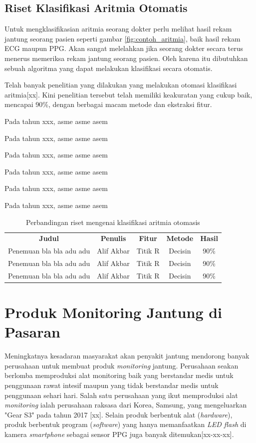 \subsection{Riset Klasifikasi Aritmia Otomatis}
Untuk mengklasifikasian aritmia seorang dokter perlu melihat hasil rekam jantung seorang pasien seperti gambar \ref{fig:contoh_aritmia}, baik hasil rekam ECG maupun PPG. Akan sangat melelahkan jika seorang dokter secara terus menerus memeriksa rekam jantung seorang pasien. Oleh karena itu dibutuhkan sebuah algoritma yang dapat melakukan klasifikasi secara otomatis. 

Telah banyak penelitian yang dilakukan yang melakukan otomasi klasifikasi aritmia[xx]. Kini penelitian tersebut telah memiliki keakuratan yang cukup baik, mencapai 90\%, dengan berbagai macam metode dan ekstraksi fitur.

Pada tahun xxx, asme asme asem

Pada tahun xxx, asme asme asem

Pada tahun xxx, asme asme asem

Pada tahun xxx, asme asme asem

Pada tahun xxx, asme asme asem

Pada tahun xxx, asme asme asem

\begin{table}[H]
\centering
	\begin{tabular}{|c|c|c|c|c|}
	\hline
	\rowcolor{gray}
	\textbf{Judul} & \textbf{Penulis} & \textbf{Fitur} & \textbf{Metode}  & \textbf{Hasil}\\
	\cline{1-5}
	Penemuan bla bla adu adu & Alif Akbar & Titik R & Decisin & 90\% \\
	\cline{1-5}
	Penemuan bla bla adu adu & Alif Akbar & Titik R & Decisin & 90\% \\
	\cline{1-5}
	Penemuan bla bla adu adu & Alif Akbar & Titik R & Decisin & 90\% \\
	\hline
	\end{tabular}
	\caption{Perbandingan riset mengenai klasifikasi aritmia otomasis}
	\label{table:tbl_comparison}
\end{table}

\section{Produk Monitoring Jantung di Pasaran}
Meningkatnya kesadaran masyarakat akan penyakit jantung mendorong banyak perusahaan untuk membuat produk \textit{monitoring} jantung. Perusahaan seakan berlomba memproduksi alat monitoring baik yang berstandar medis untuk penggunaan rawat intesif maupun yang tidak berstandar medis untuk penggunaan sehari hari. Salah satu perusahaan yang ikut memproduksi alat \textit{monitoring} ialah perusahaan raksasa dari Korea, Samsung, yang mengeluarkan "Gear S3" pada tahun 2017 [xx]. Selain produk berbentuk alat (\textit{hardware}), produk berbentuk program (\textit{software}) yang hanya memanfaatkan \textit{LED flash} di kamera \textit{smartphone} sebagai sensor PPG juga banyak ditemukan[xx-xx-xx].

